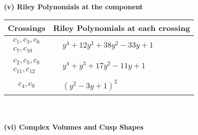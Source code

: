 \documentclass[1p]{elsarticle_modified}
\theoremstyle{definition}
\begin{document}
\newpage\renewcommand{\arraystretch}{1}
\flushleft \textbf{(v) Riley Polynomials at the component}\newline \\
\begin{tabular}{m{50pt}|m{274pt}}
Crossings & \hspace{64pt}Riley Polynomials at each crossing \\
\hline $$\begin{aligned}c_{1},c_{3},c_{6}\\c_{7},c_{10}\end{aligned}$$&$\begin{aligned}
&y^4+12 y^3+38 y^2-33 y+1
\end{aligned}$\\
\hline $$\begin{aligned}c_{2},c_{5},c_{8}\\c_{11},c_{12}\end{aligned}$$&$\begin{aligned}
&y^4+y^3+17 y^2-11 y+1
\end{aligned}$\\
\hline $$\begin{aligned}c_{4},c_{9}\end{aligned}$$&$\begin{aligned}
&(y^2-3 y+1)^2
\end{aligned}$\\
\hline
\end{tabular}\\~\\
\newpage\flushleft \textbf{(vi) Complex Volumes and Cusp Shapes}
\end{document}
